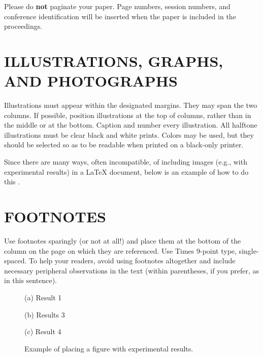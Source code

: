 \documentclass{article}
\begin{document}
Please do {\bf not} paginate your paper.  Page numbers, session numbers, and
conference identification will be inserted when the paper is included in the
proceedings.

\section{ILLUSTRATIONS, GRAPHS, AND PHOTOGRAPHS}
\label{sec:illust}

Illustrations must appear within the designated margins.  They may span the two
columns.  If possible, position illustrations at the top of columns, rather
than in the middle or at the bottom.  Caption and number every illustration.
All halftone illustrations must be clear black and white prints.  Colors may be
used, but they should be selected so as to be readable when printed on a
black-only printer.

Since there are many ways, often incompatible, of including images (e.g., with
experimental results) in a LaTeX document, below is an example of how to do
this \cite{Lamp86}.

\section{FOOTNOTES}
\label{sec:foot}

Use footnotes sparingly (or not at all!) and place them at the bottom of the
column on the page on which they are referenced. Use Times 9-point type,
single-spaced. To help your readers, avoid using footnotes altogether and
include necessary peripheral observations in the text (within parentheses, if
you prefer, as in this sentence).

\begin{figure}[htb]

\begin{minipage}[b]{1.0\linewidth}
  \centering
  \centerline{(a) Result 1}\medskip
\end{minipage}
%
\begin{minipage}[b]{.48\linewidth}
  \centering
  \centerline{(b) Results 3}\medskip
\end{minipage}
\hfill
\begin{minipage}[b]{0.48\linewidth}
  \centering
  \centerline{(c) Result 4}\medskip
\end{minipage}
%
\caption{Example of placing a figure with experimental results.}
\label{fig:res}
%
\end{figure}
\end{document}
